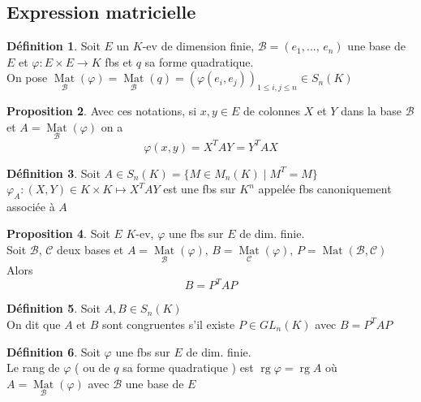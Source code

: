 \documentclass[10pt,a4paper]{article}
\theoremstyle{definition}
\newtheorem{proposition}{Proposition}[section]
\newtheorem{definition}[proposition]{Définition}
\DeclareMathOperator*{\mat}{Mat}
\DeclareMathOperator{\rg}{rg}
\begin{document}
\subsection{Expression matricielle}
\begin{definition}
    Soit \(E\) un \(K\)-ev de dimension finie, \(\mathcal{B}=(e_1, ...,\, e_n)\) une base de \(E\) et \(\varphi: E \times E \to K\) fbs et \(q\) sa forme quadratique. \\
    On pose \(\mat\limits_{\mathcal{B}}(\varphi) = \mat\limits_{\mathcal{B}}(q) = (\varphi(e_i, e_j))_{1 \leq i, j \leq n} \in S_n(K)\)
\end{definition}
\begin{proposition}
    Avec ces notations, si \(x, y \in E\) de colonnes \(X\) et \(Y\) dans la base \(\mathcal{B}\) et \(A = \mat\limits_{\mathcal{B}}(\varphi)\) on a
    \[\boxed{\varphi(x, y) = X^T A Y = Y^T A X}\]
\end{proposition}
\begin{definition}
    Soit \(A \in S_n(K) = \{ M \in M_n(K) \mid M^T = M \}\) \\
    \(\varphi_A: (X, Y) \in K \times K \mapsto X^T A Y \) est une fbs sur \(K^n\) appelée fbs canoniquement associée à \(A\)
\end{definition}

\pagebreak

\begin{proposition}
    Soit \(E\) \(K\)-ev, \(\varphi\) une fbs sur \(E\) de dim. finie. \\
    Soit \(\mathcal{B},\, \mathcal{C}\) deux bases et \(A = \mat\limits_{\mathcal{B}}(\varphi),\, B = \mat\limits_{\mathcal{C}}(\varphi),\, P = \mat(\mathcal{B}, \mathcal{C})\) \\
    Alors \[\boxed{B = P^T A P}\]
\end{proposition}
\begin{definition}
    Soit \(A, B \in S_n(K)\) \\
    On dit que \(A\) et \(B\) sont congruentes s'il existe \(P \in GL_n(K)\) avec \(B = P^T A P\)
\end{definition}
\begin{definition}
    Soit \(\varphi\) une fbs sur \(E\) de dim. finie. \\
    Le rang de \(\varphi\) ( ou de \(q\) sa forme quadratique ) est \(\rg \varphi = \rg A\) où \(A = \mat\limits_{\mathcal{B}}(\varphi)\) avec \(\mathcal{B}\) une base de \(E\)
\end{definition}
\end{document}
